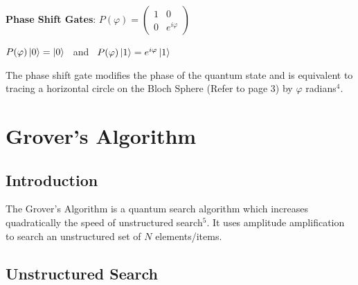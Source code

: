 \documentclass{article}
\begin{document}
\textbf{Phase Shift Gates}: \qquad $ P(\varphi) = \begin{pmatrix} 1 & 0 \\ 0 & e^{i\varphi} \end{pmatrix}$ 
\vspace{5mm}

\qquad $P(\varphi)\ket{0} = \ket{0}$ \ and \ $P(\varphi)\ket{1} = e^{i\varphi}\ket{1}$
\vspace{5mm}

\noindent
The phase shift gate modifies the phase of the quantum state and is equivalent to tracing a horizontal circle  on the Bloch Sphere (Refer to page 3) by $\varphi$ radians\hyperlink{4}{$^4$}. 
\pagebreak






\section{Grover's Algorithm}
\subsection{Introduction}

The Grover's Algorithm is a quantum search algorithm which increases quadratically the speed of unstructured search\hyperlink{5}{$^5$}. It uses  amplitude amplification to search an unstructured set of $N$ elements/items. 

\subsection{Unstructured Search}
\vspace{10mm}
\end{document}
